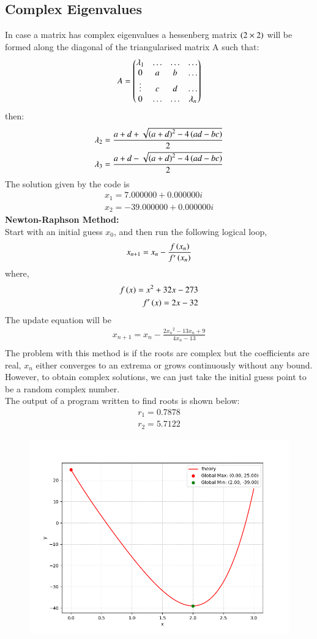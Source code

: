 \documentclass[journal,12pt,onecolumn]{IEEEtran}
\theoremstyle{remark}
\begin{document}
\subsection{Complex Eigenvalues}
In case a matrix has complex eigenvalues a hessenberg matrix $\left(2\times2\right)$ will be formed along the diagonal of the triangularised matrix A such that:
$$A=\begin{pmatrix}\lambda_1 & \dots & \dots & \dots \\ 0 & a & b & \dots\\ \vdots & c & d & \dots\\ 0 & \dots & \dots & \lambda_n\end{pmatrix}$$
then:
\begin{align*}
    \lambda_2=\frac{a+d+\sqrt{\left(a+d\right)^2-4\left(ad-bc\right)}}{2}\\
    \lambda_3=\frac{a+d-\sqrt{\left(a+d\right)^2-4\left(ad-bc\right)}}{2}\\
\end{align*}
The solution given by the code is
\begin{align}
	x_1=7.000000 + 0.000000i\\
    x_2=-39.000000 + 0.000000i
\end{align}
\textbf{Newton-Raphson Method:}\\
Start with an initial guess $x_0$, and then run the following logical loop,
\begin{align}
    x_{n+1} = x_n - \frac{f\left(x_n\right)}{f^{\prime}\left(x_n\right)} 
\end{align}
where,
\begin{align}
    f\left(x\right) = x^2 + 32x - 273\\
    f^{\prime}\left(x\right) = 2x-32
\end{align}
The update equation will be
\begin{align}
	x_{n+1} = x_n - \frac{2{x_n}^2 - 13x_n + 9}{4x_n-13}\\
\end{align}
The problem with this method is if the roots are complex but the coefficients are real, $x_n$ either converges to an extrema or grows continuously without any bound.
However, to obtain complex solutions, we can just take the initial guess point to be a
random complex number.\\
The output of a program written to find roots is shown below:
\begin{align}
	r_1 = 0.7878\\
	r_2 = 5.7122
\end{align}
\begin{figure}[h]
    \centering
    \includegraphics[width=\columnwidth]{figs/fig.png}
 \end{figure}
\end{document}
